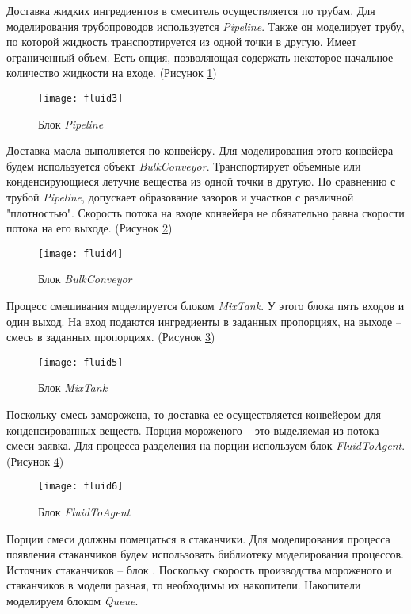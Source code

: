 Доставка жидких ингредиентов в смеситель осуществляется по трубам. Для моделирования трубопроводов используется \textit{Pipeline}. Также он моделирует трубу, по которой жидкость транспортируется из одной точки в другую. Имеет ограниченный объем. Есть опция, позволяющая содержать некоторое начальное количество жидкости на входе. (Рисунок \ref{fig:fluid3})
\begin{figure}[h]
	\centering \texttt{[image: fluid3]}
	\caption{Блок \textit{Pipeline}}
	\label{fig:fluid3}
\end{figure}

Доставка масла выполняется по конвейеру. Для моделирования этого конвейера будем используется объект \textit{BulkConveyor}. Транспортирует объемные или конденсирующиеся летучие вещества из одной точки в другую. По сравнению с трубой \textit{Pipeline}, допускает образование зазоров и участков с различной "плотностью". Скорость потока на входе конвейера не обязательно равна скорости потока на его выходе. (Рисунок \ref{fig:fluid4})
\begin{figure}[h]
	\centering \texttt{[image: fluid4]}
	\caption{Блок \textit{BulkConveyor}}
	\label{fig:fluid4}
\end{figure}

\newpage

Процесс смешивания моделируется блоком \textit{MixTank}. У этого блока пять входов и один выход. На вход подаются ингредиенты в заданных пропорциях, на выходе -- смесь в заданных пропорциях. (Рисунок \ref{fig:fluid5})
\begin{figure}[h]
	\centering \texttt{[image: fluid5]}
	\caption{Блок \textit{MixTank}}
	\label{fig:fluid5}
\end{figure}

Поскольку смесь заморожена, то доставка ее осуществляется конвейером для конденсированных веществ. Порция мороженого -- это выделяемая из потока смеси заявка. Для процесса разделения на порции используем блок \textit{FluidToAgent}. (Рисунок \ref{fig:fluid6})
\begin{figure}[h]
	\centering \texttt{[image: fluid6]}
	\caption{Блок \textit{FluidToAgent}}
	\label{fig:fluid6}
\end{figure}

Порции смеси должны помещаться в стаканчики. Для моделирования процесса появления стаканчиков будем использовать библиотеку моделирования процессов. Источник стаканчиков – блок .  Поскольку скорость производства мороженого и стаканчиков в модели разная, то необходимы их накопители. Накопители моделируем блоком \textit{Queue}.\\

